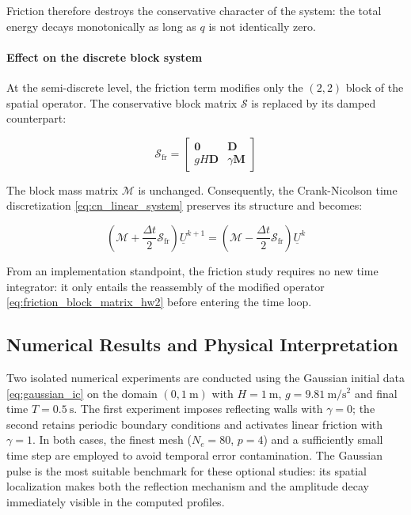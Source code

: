 Friction therefore destroys the conservative character of the system: the total energy decays monotonically as long as \(q\) is not identically zero.

\paragraph{Effect on the discrete block system}
At the semi-discrete level, the friction term modifies only the \((2,2)\) block of the spatial operator. The conservative block matrix \(\mathcal{S}\) is replaced by its damped counterpart:

\begin{equation}
\mathcal{S}_{\mathrm{fr}}
=
\begin{bmatrix}
\mathbf{0} & \mathbf{D}\\
gH\mathbf{D} & \gamma\mathbf{M}
\end{bmatrix}
\label{eq:friction_block_matrix_hw2}
\end{equation}

The block mass matrix \(\mathcal{M}\) is unchanged. Consequently, the Crank-Nicolson time discretization \eqref{eq:cn_linear_system} preserves its structure and becomes:

\begin{equation}
\left(\mathcal{M} + \frac{\Delta t}{2}\mathcal{S}_{\mathrm{fr}}\right)\underline{U}^{k+1}
=
\left(\mathcal{M} - \frac{\Delta t}{2}\mathcal{S}_{\mathrm{fr}}\right)\underline{U}^{k}
\label{eq:friction_cn_hw2}
\end{equation}

From an implementation standpoint, the friction study requires no new time integrator: it only entails the reassembly of the modified operator \eqref{eq:friction_block_matrix_hw2} before entering the time loop.

\subsection{Numerical Results and Physical Interpretation}

Two isolated numerical experiments are conducted using the Gaussian initial data \eqref{eq:gaussian_ic} on the domain \((0, \SI{1}{\meter})\) with \(H = \SI{1}{\meter}\), \(g = \SI{9.81}{\meter\per\second\squared}\) and final time \(T = \SI{0.5}{\second}\). The first experiment imposes reflecting walls with \(\gamma = 0\); the second retains periodic boundary conditions and activates linear friction with \(\gamma = 1\). In both cases, the finest mesh (\(N_e = 80\), \(p = 4\)) and a sufficiently small time step are employed to avoid temporal error contamination. The Gaussian pulse is the most suitable benchmark for these optional studies: its spatial localization makes both the reflection mechanism and the amplitude decay immediately visible in the computed profiles.

